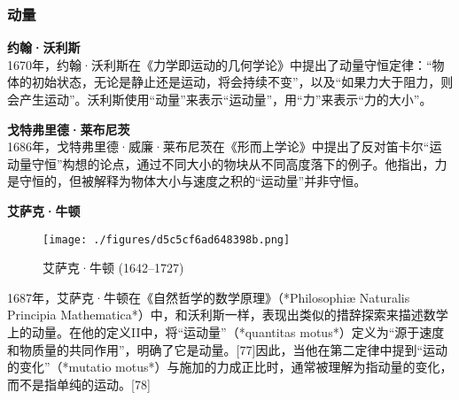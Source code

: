 \subsubsection{动量}  
\textbf{约翰·沃利斯}\\  
1670年，约翰·沃利斯在《力学即运动的几何学论》中提出了动量守恒定律：“物体的初始状态，无论是静止还是运动，将会持续不变”，以及“如果力大于阻力，则会产生运动”。沃利斯使用“动量”来表示“运动量”，用“力”来表示“力的大小”。  

\textbf{戈特弗里德·莱布尼茨}\\  
1686年，戈特弗里德·威廉·莱布尼茨在《形而上学论》中提出了反对笛卡尔“运动量守恒”构想的论点，通过不同大小的物块从不同高度落下的例子。他指出，力是守恒的，但被解释为物体大小与速度之积的“运动量”并非守恒。

\textbf{艾萨克·牛顿}\\  
\begin{figure}[ht]
\centering
\texttt{[image: ./figures/d5c5cf6ad648398b.png]}
\caption{艾萨克·牛顿   (1642–1727)} \label{fig_DL_8}
\end{figure}
1687年，艾萨克·牛顿在《自然哲学的数学原理》（*Philosophiæ Naturalis Principia Mathematica*）中，和沃利斯一样，表现出类似的措辞探索来描述数学上的动量。在他的定义II中，将“运动量”（*quantitas motus*）定义为“源于速度和物质量的共同作用”，明确了它是动量。[77]因此，当他在第二定律中提到“运动的变化”（*mutatio motus*）与施加的力成正比时，通常被理解为指动量的变化，而不是指单纯的运动。[78]